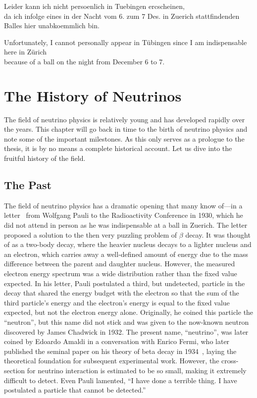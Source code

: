 \begin{savequote}[8cm]
Leider kann ich nicht persoenlich in Tuebingen ercscheinen, \\
da ich infolge eines in der Nacht vom 6. zum 7 Des. in Zuerich stattfindenden Balles hier unabkoemmlich bin.

  Unfortunately, I cannot personally appear in Tübingen since I am indispensable here in Zürich \\ because of a ball on the night from December 6 to 7.

\end{savequote}

\chapter{\label{ch:nu-hist}The History of Neutrinos}
\minitoc

The field of neutrino physics is relatively young and has developed rapidly over the years.
This chapter will go back in time to the birth of neutrino physics and note some of the important milestones.
As this only serves as a prologue to the thesis, it is by no means a complete historical account.
Let us dive into the fruitful history of the field.

\section{The Past}
The field of neutrino physics has a dramatic opening that many know of—in a letter~\cite{Pauli:1930pc} from Wolfgang Pauli to the Radioactivity Conference in 1930, which he did not attend in person as he was indispensable at a ball in Zuerich. 
The letter proposed a solution to the then very puzzling problem of $\beta$ decay.
It was thought of as a two-body decay, where the heavier nucleus decays to a lighter nucleus and an electron, which carries away a well-defined amount of energy due to the mass difference between the parent and daughter nucleus.  
However, the measured electron energy spectrum was a wide distribution rather than the fixed value expected. 
In his letter, Pauli postulated a third, but undetected, particle in the decay that shared the energy budget with the electron so that the sum of the third particle's energy and the electron's energy is equal to the fixed value expected, but not the electron energy alone. 
Originally, he coined this particle the ``neutron'', but this name did not stick and was given to the now-known neutron discovered by James Chadwick in 1932.
The present name, ``neutrino'', was later coined by Edoardo Amaldi in a conversation with Enrico Fermi, who later published the seminal paper on his theory of beta decay in 1934~\cite{Fermi:1934hr}, laying the theoretical foundation for subsequent experimental work.
However, the cross-section for neutrino interaction is estimated to be so small, making it extremely difficult to detect.
Even Pauli lamented, ``I have done a terrible thing. I have postulated a particle that cannot be detected.''

